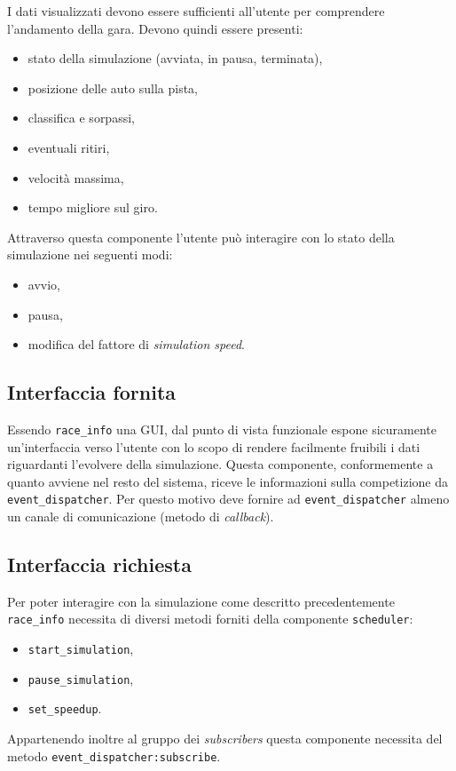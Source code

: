 \documentclass[a4paper]{report}
\newcommand{\fun}[1]{\texttt{#1}}
\begin{document}
I dati visualizzati devono essere sufficienti all'utente per comprendere l'andamento della gara. Devono quindi essere presenti:
\begin{itemize}
\item stato della simulazione (avviata, in pausa, terminata),
\item posizione delle auto sulla pista,
\item classifica e sorpassi,
\item eventuali ritiri,
\item velocità massima,
\item tempo migliore sul giro.
\end{itemize}
Attraverso questa componente l'utente può interagire con lo stato della simulazione nei seguenti modi:
\begin{itemize}
\item avvio,
\item pausa,
\item modifica del fattore di \textit{simulation speed}.
\end{itemize}

\subsection*{Interfaccia fornita}
Essendo \texttt{race\_info} una GUI, dal punto di vista funzionale espone sicuramente un'interfaccia verso l'utente con lo scopo di rendere facilmente fruibili i dati riguardanti l'evolvere della simulazione.
Questa componente, conformemente a quanto avviene nel resto del sistema, riceve le informazioni sulla competizione da \texttt{event\_dispatcher}. Per questo motivo deve fornire ad \texttt{event\_dispatcher} almeno un canale di comunicazione (metodo di \textit{callback}).

\subsection*{Interfaccia richiesta}
Per poter interagire con la simulazione come descritto precedentemente \texttt{race\_info} necessita di diversi metodi forniti della componente \texttt{scheduler}:
\begin{itemize}
\item \fun{start\_simulation},
\item \fun{pause\_simulation},
\item \fun{set\_speedup}.
\end{itemize}
Appartenendo inoltre al gruppo dei \textit{subscribers} questa componente necessita del metodo \fun{event\_dispatcher:subscribe}.
\end{document}
